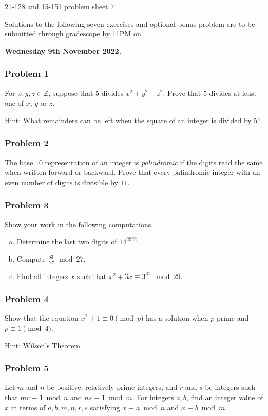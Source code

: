 \newpage\documentclass[11pt,onecolumn,fleqn]{article}
\theoremstyle{definition}
\begin{document}
\thispagestyle{empty}
\begin{center}
{\Huge 21-128 and 15-151 problem sheet 7}

Solutions to the following seven exercises and optional bonus problem are to be submitted through 
gradescope by 11PM on

\textbf{Wednesday 9th November 2022.}

\end{center}

\subsubsection*{Problem 1}
For $x,y,z \in \mathbb{Z}$, suppose that $5$ divides $x^2+y^2+z^2$. Prove that $5$ divides at least one of $x$, $y$ or $z$.

\noindent
Hint: What remainders can be left when the square of an integer is divided by 5?


\subsubsection*{Problem 2}
The base $10$ representation of an integer is \textit{palindromic} if the digits read the same when written forward or backward. 
Prove that every palindromic integer with an even number of digits is divisible by $11$. 


\subsubsection*{Problem 3} 
Show your work in the following computations.
\begin{enumerate}[(a)]
    \item Determine the last two digits of $14^{2022}$.
    \item Compute $\frac{53!}{27} \bmod 27$.
    \item Find all integers $x$ such that $x^2 + 3x \equiv 3^{31} \mod 29$.
\end{enumerate}


\subsubsection*{Problem 4}
Show that the equation $x^{2}+1\equiv0\pmod{p}$ has a solution when $p$ prime and $p\equiv1\pmod{4}$. 

Hint: Wilson's Theorem.


\subsubsection*{Problem 5}
Let $m$ and $n$ be positive, relatively prime integers, and $r$ and $s$ be integers such that 
$mr \equiv 1 \bmod n$ and $ns \equiv 1 \bmod m$. For integers $a,b$, find an integer value of 
$x$ in terms of $a,b,m,n,r,s$ satisfying $x \equiv a \bmod n$ and $x \equiv b \bmod m$.
\end{document}

